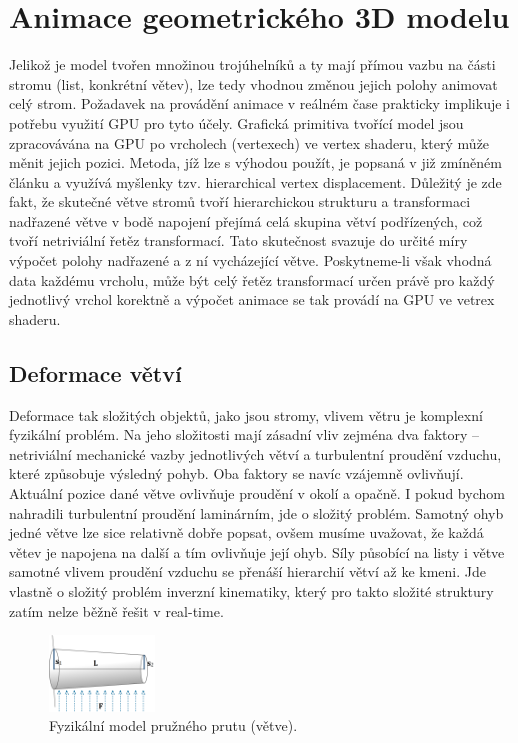\section{Animace geometrického 3D modelu}

Jelikož je model tvořen množinou trojúhelníků a ty mají přímou vazbu na části stromu (list, konkrétní větev), lze tedy vhodnou změnou jejich polohy animovat celý strom. Požadavek na provádění animace v reálném čase prakticky implikuje i potřebu využití GPU pro tyto účely. Grafická primitiva tvořící model jsou zpracovávána na GPU po vrcholech (vertexech) ve vertex shaderu, který může měnit jejich pozici. 
Metoda, jíž lze s výhodou použít, je popsaná v již zmíněném článku \cite{Habel_09_PGT} a využívá myšlenky tzv. hierarchical vertex displacement. Důležitý je zde fakt, že skutečné větve stromů tvoří hierarchickou strukturu a transformaci nadřazené větve v bodě napojení přejímá celá skupina větví podřízených, což tvoří netriviální řetěz transformací. Tato skutečnost svazuje do určité míry výpočet polohy nadřazené a z ní vycházející větve. Poskytneme-li však vhodná data každému vrcholu, může být celý řetěz transformací určen právě pro každý jednotlivý vrchol korektně a výpočet animace se tak provádí na GPU ve vetrex shaderu.

\subsection{Deformace větví}
\label{sec-branchDeformation}

Deformace tak složitých objektů, jako jsou stromy, vlivem větru je komplexní fyzikální problém. Na jeho složitosti mají zásadní vliv zejména dva faktory – netriviální mechanické vazby jednotlivých větví a turbulentní proudění vzduchu, které způsobuje výsledný pohyb. Oba faktory se navíc vzájemně ovlivňují. Aktuální pozice dané větve ovlivňuje proudění v okolí a opačně. I pokud bychom nahradili turbulentní proudění laminárním, jde o složitý problém. Samotný ohyb jedné větve lze sice relativně dobře popsat, ovšem musíme uvažovat, že každá větev je napojena na další a tím ovlivňuje její ohyb. Síly působící na listy i větve samotné vlivem proudění vzduchu se přenáší hierarchií větví až ke kmeni. Jde vlastně o složitý problém inverzní kinematiky, který pro takto složité struktury zatím nelze běžně řešit v real-time. 
\begin{figure}[!hbt]
\begin{center}
\includegraphics[width=0.25\textwidth]{./figures/branchBeamModel.png}
\end{center}
\caption{Fyzikální model pružného prutu (větve).
\label{fig:branchBeamModel}
}
\end{figure}

